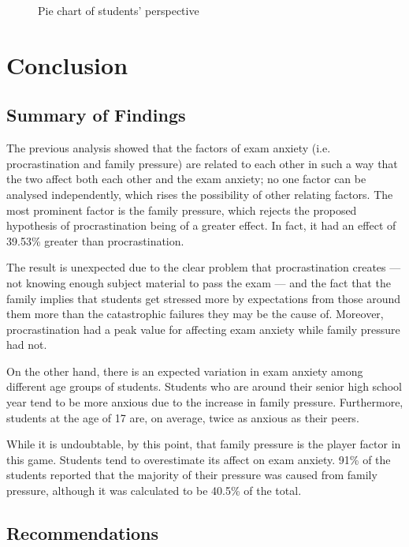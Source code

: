 \documentclass[12pt]{report}
\begin{document}
\begin{multicols}{2}
\begin{figure}[H]
    \center
    \vspace*{-1mm}
    \caption{Pie chart of students' perspective}
    \label{fig:pie}
\end{figure}

\end{multicols}

\chapter{Conclusion}
\begin{multicols}{2}

\section{Summary of Findings}

The previous analysis showed that the factors of exam anxiety (i.e.
procrastination and family pressure) are related to each other in such a way
that the two affect both each other and the exam anxiety; no one factor can be
analysed independently, which rises the possibility of other relating factors.
The most prominent factor is the family pressure, which rejects the proposed
hypothesis of procrastination being of a greater effect. In fact, it had an
effect of 39.53\% greater than procrastination.

The result is unexpected due to the clear problem that procrastination creates —
not knowing enough subject material to pass the exam — and the fact that the
family implies that students get stressed more by expectations from those around
them more than the catastrophic failures they may be the cause of. Moreover,
procrastination had a peak value for affecting exam anxiety while family
pressure had not.

On the other hand, there is an expected variation in exam anxiety among
different age groups of students. Students who are around their senior high
school year tend to be more anxious due to the increase in family pressure.
Furthermore, students at the age of 17 are, on average, twice as anxious as
their peers. 

While it is undoubtable, by this point, that family pressure is the player
factor in this game. Students tend to overestimate its affect on exam anxiety.
91\% of the students reported that the majority of their pressure was caused
from family pressure, although it was calculated to be 40.5\% of the total.

\section{Recommendations}
\kant[2]

\end{multicols}
\end{document}
